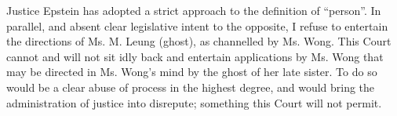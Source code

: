 \par\bigskip 
[74]      Justice Epstein has adopted a strict approach to the definition of ``person''. In parallel, and absent clear legislative intent to the opposite, I refuse to entertain the directions of Ms. M. Leung (ghost), as channelled by Ms. Wong. This Court cannot and will not sit idly back and entertain applications by Ms. Wong that may be directed in Ms. Wong’s mind by the ghost of her late sister. To do so would be a clear abuse of process in the highest degree, and would bring the administration of justice into disrepute; something this Court will not permit. \endinput